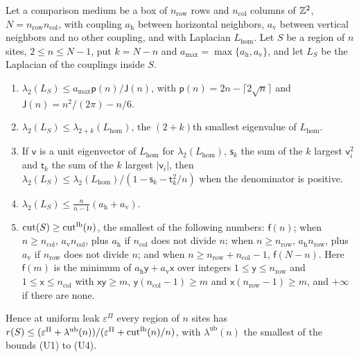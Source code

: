 \begin{lemma}\label{lem:col-box-bounds}
Let a comparison medium be a box of $n_{\mathrm{row}}$ rows and $n_{\mathrm{col}}$ columns of $\mathbb{Z}^2$, $N=n_{\mathrm{row}}n_{\mathrm{col}}$, with coupling $a_{\mathrm h}$ between horizontal neighbors, $a_{\mathrm v}$ between vertical neighbors and no other coupling, and with Laplacian $L_{\mathrm{hom}}$. Let $S$ be a region of $n$ sites, $2\le n\le N-1$, put $k=N-n$ and $a_{\max}=\max\{a_{\mathrm h},a_{\mathrm v}\}$, and let $L_S$ be the Laplacian of the couplings inside $S$.
\begin{enumerate}
\item[(U1)] $\lambda_2(L_S)\le a_{\max}\mathsf p(n)/\mathsf J(n)$, with $\mathsf p(n)=2n-\lceil2\sqrt n\rceil$ and $\mathsf J(n)=n^2/(2\pi)-n/6$.
\item[(U2)] $\lambda_2(L_S)\le\lambda_{2+k}(L_{\mathrm{hom}})$, the $(2+k)$th smallest eigenvalue of $L_{\mathrm{hom}}$.
\item[(U3)] If $\mathsf v$ is a unit eigenvector of $L_{\mathrm{hom}}$ for $\lambda_2(L_{\mathrm{hom}})$, $\mathsf s_k$ the sum of the $k$ largest $\mathsf v_i^2$ and $\mathsf t_k$ the sum of the $k$ largest $|\mathsf v_i|$, then $\lambda_2(L_S)\le\lambda_2(L_{\mathrm{hom}})/(1-\mathsf s_k-\mathsf t_k^2/n)$ when the denominator is positive.
\item[(U4)] $\lambda_2(L_S)\le\frac n{n-1}(a_{\mathrm h}+a_{\mathrm v})$.
\item[(C)] $\operatorname{cut}(S)\ge\operatorname{cut}^{\mathrm{lb}}(n)$, the smallest of the following numbers: $\mathsf f(n)$; when $n\ge n_{\mathrm{col}}$, $a_{\mathrm v}n_{\mathrm{col}}$, plus $a_{\mathrm h}$ if $n_{\mathrm{col}}$ does not divide $n$; when $n\ge n_{\mathrm{row}}$, $a_{\mathrm h}n_{\mathrm{row}}$, plus $a_{\mathrm v}$ if $n_{\mathrm{row}}$ does not divide $n$; and when $n\ge n_{\mathrm{row}}+n_{\mathrm{col}}-1$, $\mathsf f(N-n)$. Here $\mathsf f(m)$ is the minimum of $a_{\mathrm h}\mathsf y+a_{\mathrm v}\mathsf x$ over integers $1\le\mathsf y\le n_{\mathrm{row}}$ and $1\le\mathsf x\le n_{\mathrm{col}}$ with $\mathsf x\mathsf y\ge m$, $\mathsf y(n_{\mathrm{col}}-1)\ge m$ and $\mathsf x(n_{\mathrm{row}}-1)\ge m$, and $+\infty$ if there are none.
\end{enumerate}
Hence at uniform leak $\varepsilon^\Pi$ every region of $n$ sites has $r(S)\le(\varepsilon^\Pi+\lambda^{\mathrm{ub}}(n))/(\varepsilon^\Pi+\operatorname{cut}^{\mathrm{lb}}(n)/n)$, with $\lambda^{\mathrm{ub}}(n)$ the smallest of the bounds (U1) to (U4).
\end{lemma}
